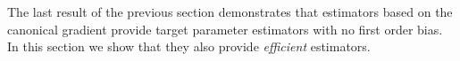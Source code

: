 \documentclass[a4,danish]{article}
\begin{document}
 

The last result of the previous section demonstrates that estimators
based on the canonical gradient provide target parameter estimators
with no first order bias. In this section we show that they also
provide \textit{efficient} estimators.



\end{document}

